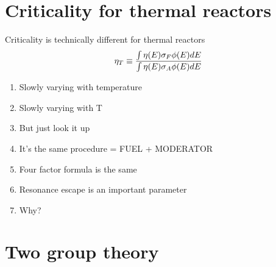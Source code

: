 \documentclass[aspectratio=1610,pdftex,dvipsnames,compress,xcolor={dvipsnames}]{beamer}
\begin{document}
\section{Criticality for thermal reactors}


\addtocounter{framenumber}{-1} 
\begin{frame}{Criticality is technically different for thermal reactors}
    \begin{equation}
       \LARGE
        \eta_T \equiv \frac{\int \eta(E) \sigma_F \phi(E) dE}{\int \eta(E) \sigma_A \phi(E) dE}
    \end{equation}

    \vspace*{\fill}

    \begin{enumerate}[series=outerlist,topsep=0pt,itemsep=11pt,leftmargin=*,label=(\arabic*)]
        \item[]Slowly varying with temperature
        \item[]Slowly varying with T
        \item[]But just look it up
        \item[]It's the same procedure = FUEL + MODERATOR
        \item[]Four factor formula is the same
        \item[]Resonance escape is an important parameter
        \item[]Why?
    \end{enumerate}
\end{frame}


\section{Two group theory}
\end{document}
